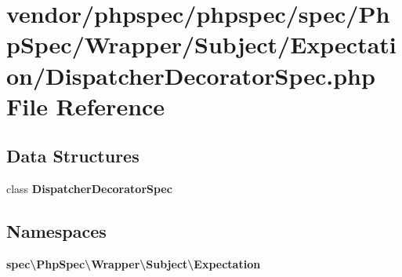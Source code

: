 \section{vendor/phpspec/phpspec/spec/\+Php\+Spec/\+Wrapper/\+Subject/\+Expectation/\+Dispatcher\+Decorator\+Spec.php File Reference}
\label{_dispatcher_decorator_spec_8php}
\subsection*{Data Structures}
\begin{DoxyCompactItemize}
\item 
class {\bf Dispatcher\+Decorator\+Spec}
\end{DoxyCompactItemize}
\subsection*{Namespaces}
\begin{DoxyCompactItemize}
\item 
 {\bf spec\textbackslash{}\+Php\+Spec\textbackslash{}\+Wrapper\textbackslash{}\+Subject\textbackslash{}\+Expectation}
\end{DoxyCompactItemize}
